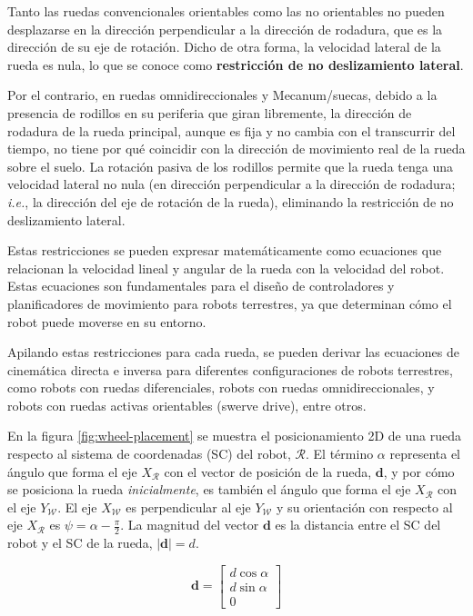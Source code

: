 \documentclass[11pt,a4paper]{article}
\newcommand{\vect}[1]{\bm{#1}}       %
\newcommand{\frameR}{\mathcal{R}}
\newcommand{\ejeXR}{X_{\frameR}}
\newcommand{\frameW}{\mathcal{W}}
\newcommand{\ejeXW}{X_{\frameW}}
\newcommand{\ejeYW}{Y_{\frameW}}
\begin{document}
Tanto las ruedas convencionales orientables como las no orientables no pueden desplazarse en la dirección perpendicular a la dirección de rodadura, que es la dirección de su eje de rotación. Dicho de otra forma, la velocidad lateral de la rueda es nula, lo que se conoce como \textbf{restricción de no deslizamiento lateral}.

Por el contrario, en ruedas omnidireccionales y Mecanum/suecas, debido a la presencia de rodillos en su periferia que giran libremente, la dirección de rodadura de la rueda principal, aunque es fija y no cambia con el transcurrir del tiempo, no tiene por qué coincidir con la dirección de movimiento real de la rueda sobre el suelo. La rotación pasiva de los rodillos permite que la rueda tenga una velocidad lateral no nula (en dirección perpendicular a la dirección de rodadura; \textit{i.e.}, la dirección del eje de rotación de la rueda), eliminando la restricción de no deslizamiento lateral.

Estas restricciones se pueden expresar matemáticamente como ecuaciones que relacionan la velocidad lineal y angular de la rueda con la velocidad del robot. Estas ecuaciones son fundamentales para el diseño de controladores y planificadores de movimiento para robots terrestres, ya que determinan cómo el robot puede moverse en su entorno.

Apilando estas restricciones para cada rueda, se pueden derivar las ecuaciones de cinemática directa e inversa para diferentes configuraciones de robots terrestres, como robots con ruedas diferenciales, robots con ruedas omnidireccionales, y robots con ruedas activas orientables (swerve drive), entre otros.

En la figura \ref{fig:wheel-placement} se muestra el posicionamiento 2D de una rueda respecto al sistema de coordenadas (SC) del robot, \(\frameR\).
El término \(\alpha\) representa el ángulo que forma el eje \(\ejeXR\) con el vector de posición de la rueda, \(\vect{d}\), y por cómo se posiciona la rueda \textit{inicialmente}, es también el ángulo que forma el eje \(\ejeXR\) con el eje \(\ejeYW\). El eje \(\ejeXW\) es perpendicular al eje \(\ejeYW\) y su orientación con respecto al eje \(\ejeXR\) es \(\psi = \alpha - \frac{\pi}{2}\).
La magnitud del vector \(\vect{d}\) es la distancia entre el SC del robot y el SC de la rueda, \(\left|\bm{d}\right| = d\).

\begin{equation}
    \vect{d} = \begin{bmatrix} d\cos\alpha \\ d\sin\alpha \\ 0 \end{bmatrix}
\end{equation}
\end{document}
